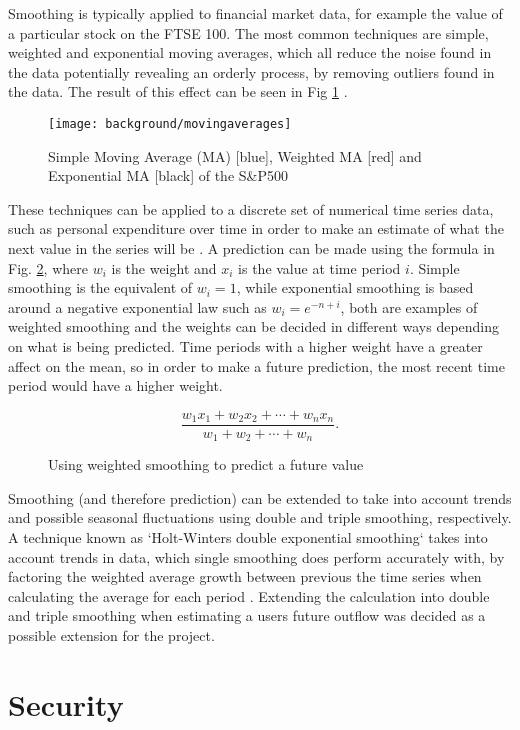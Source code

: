 Smoothing is typically applied to financial market data, for example the value of a particular stock on the FTSE 100. The most common techniques are simple, weighted and exponential moving averages, which all reduce the noise found in the data potentially revealing an orderly process, by removing outliers found in the data. The result of this effect can be seen in Fig \ref{fig:dashweightedaverages} \parencite{dash2012movingaverages}.

\begin{figure}[h]
    \centering
    \texttt{[image: background/movingaverages]}
    \caption[SMA, WMA and EMA of the S\&P500]{Simple Moving Average (MA) [blue], Weighted MA [red] and Exponential MA [black] of the S\&P500\protect\footnotemark  \parencite[Fig. 5]{dash2012movingaverages}}
    \label{fig:dashweightedaverages}
\end{figure}

These techniques can be applied to a discrete set of numerical time series data, such as personal expenditure over time in order to make an estimate of what the next value in the series will be \parencite{filliben2003nist}. A prediction can be made using the formula in Fig. \ref{fig:weightedmeanforumla}, where $w_{i}$ is the weight and $x_i$ is the value at time period $i$. Simple smoothing is the equivalent of $w_i = 1$, while exponential smoothing is based around a negative exponential law such as $w_i = e^{-n+i}$, both are examples of weighted smoothing and the weights can be decided in different ways depending on what is being predicted. Time periods with a higher weight have a greater affect on the mean, so in order to make a future prediction, the most recent time period would have a higher weight.  

\begin{figure}[h]
    \centering
    \[
        \frac{w_1 x_1 + w_2 x_2 + \cdots + w_n x_n}{w_1 + w_2 + \cdots + w_n}.
    \]
    \caption{Using weighted smoothing to predict a future value}
    \label{fig:weightedmeanforumla}
\end{figure}

Smoothing (and therefore prediction) can be extended to take into account trends and possible seasonal fluctuations using double and triple smoothing, respectively. A technique known as `Holt-Winters double exponential smoothing` takes into account trends in data, which single smoothing does perform accurately with, by factoring the weighted average growth between previous the time series when calculating the average for each period \parencite{kalekar2004holtwinters}.  
% 
Extending the calculation into double and triple smoothing when estimating a users future outflow was decided as a possible extension for the project.  

\section{Security}
 


